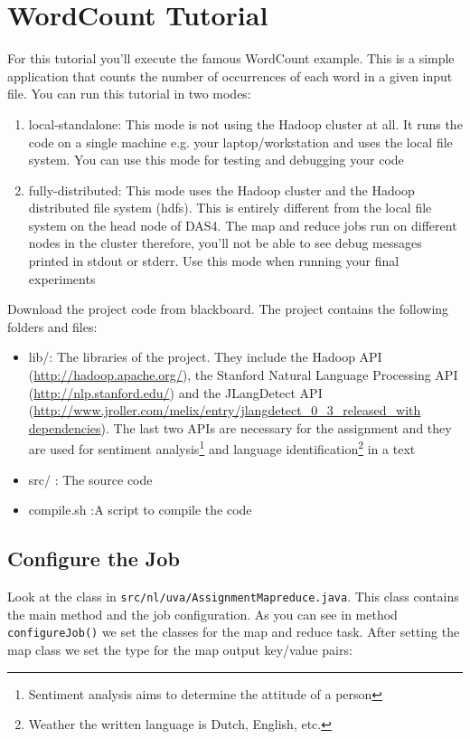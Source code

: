 \documentclass[a4paper,10pt]{article}
\begin{document}
\section{WordCount Tutorial}

For this tutorial you'll execute the famous WordCount example. This is a simple application that counts the number of occurrences of each word in a given input file. You can run this tutorial in two modes: 
\begin{enumerate}
 \item local-standalone: This mode is not using the Hadoop cluster at all. It runs the code on a single machine e.g. your laptop/workstation and uses the local file system. You can use this mode for testing and debugging your code
 \item fully-distributed: This mode uses the Hadoop cluster and the Hadoop distributed file system (hdfs). This is entirely different from the local file system on the head node of DAS4. The map and reduce jobs run on different nodes in the cluster  therefore, you'll not be able to see debug messages printed in stdout or stderr. Use this mode when running your final experiments
\end{enumerate}

Download the project code from blackboard. The project contains the following folders and files: 

\begin{itemize}
 \item lib/: The libraries of the project. They include the Hadoop API (\url{http://hadoop.apache.org/}), the Stanford Natural Language Processing API (\url{http://nlp.stanford.edu/}) and the JLangDetect API (\url{http://www.jroller.com/melix/entry/jlangdetect\_0\_3\_released\_with dependencies}). The last two APIs are necessary for the assignment and they are used for sentiment analysis\footnote{Sentiment analysis aims to determine the attitude of a person} and language identification\footnote{Weather the written language is Dutch, English, etc. } in a text
 \item src/ : The source code
 \item compile.sh :A script to compile the code
\end{itemize}


\subsection{Configure the Job}

Look at the class in \texttt{src/nl/uva/AssignmentMapreduce.java}. This class contains the main method and the job configuration. 
% 
As you can see in method \texttt{configureJob()} we set the classes for the map and reduce task. After setting the map class we set the type for the map output key/value pairs:
\end{document}
